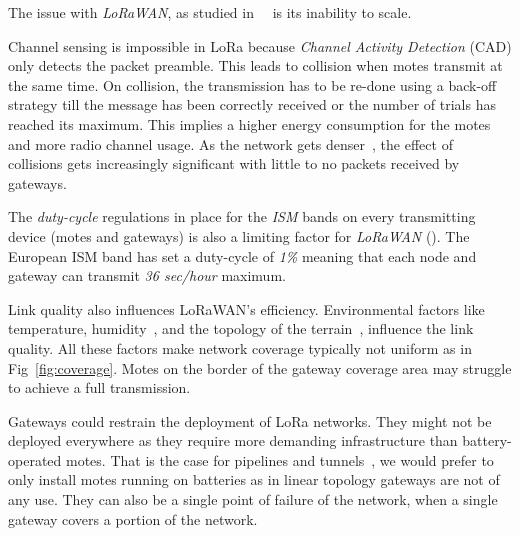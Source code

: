 

The issue with \emph{LoRaWAN}, as studied 
in~\cite{8030482}~\cite{10.1145/2988287.2989163} is its inability to scale. 

Channel sensing is impossible in LoRa because \emph{Channel Activity Detection}
(CAD) only detects the packet preamble. %
This leads to collision when motes transmit at the same time.
On collision, the transmission has to be re-done using a back-off strategy till the
message has been correctly received or the number of trials has reached its
maximum.
This implies a higher energy consumption for the motes and more radio 
channel usage.
As the network gets denser~\cite{8030482}, the effect of collisions gets
increasingly significant with little to no packets received by gateways.


The \emph{duty-cycle} regulations in place for the \emph{ISM} bands on every
transmitting device (motes and gateways) is also a limiting factor 
for \emph{LoRaWAN} (\cite{8030482}).
The European ISM band has set a duty-cycle of \emph{1\%} meaning that each node 
and gateway can transmit \emph{36 sec/hour} maximum. 


Link quality also influences LoRaWAN's efficiency. 
Environmental factors like temperature,
humidity~\cite{evaluation_of_the_reliability_of_lora}, and the topology of the
terrain~\cite{lorajambalaya}, influence the link quality.
All these factors make network coverage typically not uniform 
as in Fig~\ref{fig:coverage}.
Motes on the border of the gateway coverage area may struggle to
achieve a full transmission. 

Gateways could restrain the deployment of LoRa networks.
They might not be deployed everywhere as they require more demanding infrastructure 
than battery-operated motes.
That is the case for pipelines and tunnels~\cite{Abrardo_2019},
we would prefer to only install motes running on batteries as in linear
topology gateways are not of any use.
They can also be a single point of failure of the network, when a single
gateway covers a portion of the network. 

